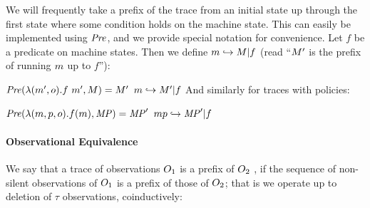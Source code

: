 \documentclass[acmsmall,review,anonymous]{acmart}\settopmatter{printfolios=true,printccs=false,printacmref=false}
\begin{document}

We will frequently take a prefix of the trace from an initial state up
through the first state where some condition holds on the machine state.
This can easily be implemented using \(\mathit{Pre}\), and we provide special notation
for convenience.
%
Let \(f\) be a predicate on machine states. Then we define \(m
\hookrightarrow M | f\) (read ``\(M'\) is the prefix of
running \(m\) up to \(f\)''):

\judgmenttwo{\(\mach \hookrightarrow \machT\)}
            {\(\PUT(\lambda (\mach',\obs).f\ \mach',\machT)
              = \machT'\)}
            {\(m \hookrightarrow M' | f\)}
\noindent
And similarly for traces with policies:

\judgmenttwo{\(\mpstatename \hookrightarrow \MPT\)}
            {\(\mathit{Pre}(\lambda (m,p,o).f(m),\mathit{MP}) = \mathit{MP}'\)}
         {\(mp \hookrightarrow \mathit{MP}' | f\)}


\paragraph*{Observational Equivalence}

We say that a trace of observations $O_1$ is a prefix of $O_2$
, if the
sequence of non-silent observations of $O_1$ is a prefix of those
of $O_2$; that is we operate up to deletion of \(\tau\)
observations, coinductively:

\judgment{}{\(\obsT \lesssim \obsT\)}
\end{document}
